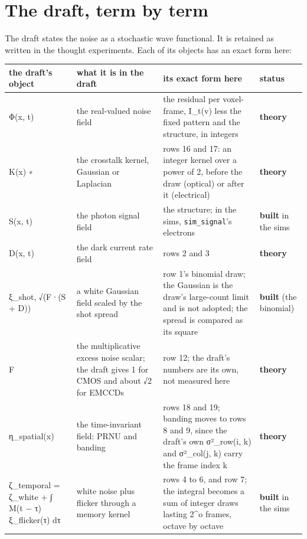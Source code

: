\section{\texorpdfstring{The draft, term by term}{The draft, term by term}}

The draft states the noise as a stochastic wave functional. It is retained as written in the thought experiments. Each of its objects has an exact form here:

{\footnotesize
\setlength{\tabcolsep}{6pt}
\begin{longtable}{>{\RaggedRight\arraybackslash}p{}>{\RaggedRight\arraybackslash}p{}>{\RaggedRight\arraybackslash}p{}>{\RaggedRight\arraybackslash}p{}}
\toprule
the draft's object & what it is in the draft & its exact form here & status \\
\midrule
\endhead
Φ(x, t) & the real-valued noise field & the residual per voxel-frame, I\_\allowbreak{}t(v) less the fixed pattern and the structure, in integers & \textbf{theory} \\
K(x) ∗ & the crosstalk kernel, Gaussian or Laplacian & rows 16 and 17: an integer kernel over a power of 2, before the draw (optical) or after it (electrical) & \textbf{theory} \\
S(x, t) & the photon signal field & the structure; in the sims, \texttt{sim\_\allowbreak{}signal}'s electrons & \textbf{built} in the sims \\
D(x, t) & the dark current rate field & rows 2 and 3 & \textbf{theory} \\
ξ\_\allowbreak{}shot, √(F·(S + D)) & a white Gaussian field scaled by the shot spread & row 1's binomial draw; the Gaussian is the draw's large-count limit and is not adopted; the spread is compared as its square & \textbf{built} (the binomial) \\
F & the multiplicative excess noise scalar; the draft gives 1 for CMOS and about √2 for EMCCDs & row 12; the draft's numbers are its own, not measured here & \textbf{theory} \\
η\_\allowbreak{}spatial(x) & the time-invariant field: PRNU and banding & rows 18 and 19; banding moves to rows 8 and 9, since the draft's own σ²\_\allowbreak{}row(i, k) and σ²\_\allowbreak{}col(j, k) carry the frame index k & \textbf{theory} \\
ζ\_\allowbreak{}temporal = ζ\_\allowbreak{}white + ∫ M(t − τ) ξ\_\allowbreak{}flicker(τ) dτ & white noise plus flicker through a memory kernel & rows 4 to 6, and row 7; the integral becomes a sum of integer draws lasting 2\textasciicircum{}o frames, octave by octave & \textbf{built} in the sims \\

\end{longtable}}
